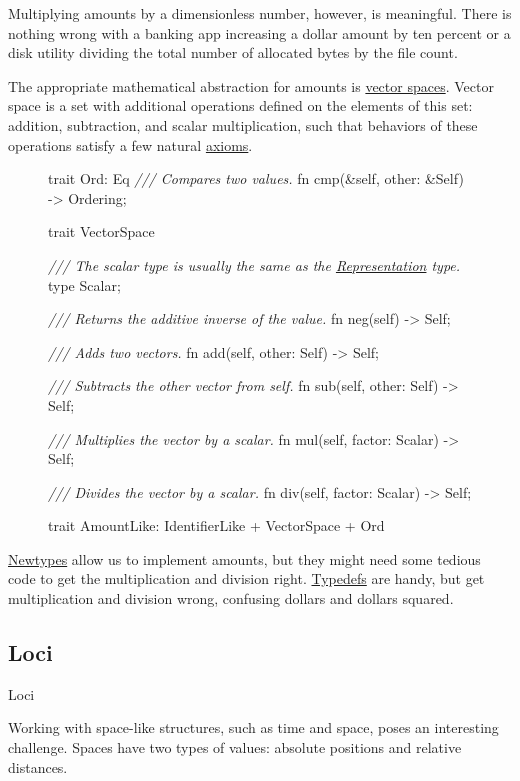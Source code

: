 \documentclass{article}
\begin{document}
Multiplying amounts by a dimensionless number, however, is meaningful.
There is nothing wrong with a banking app increasing a dollar amount by ten percent or a disk utility dividing the total number of allocated bytes by the file count.

The appropriate mathematical abstraction for amounts is \href{https://en.wikipedia.org/wiki/Vector_space}{vector spaces}.
Vector space is a set with additional operations defined on the elements of this set: addition, subtraction, and scalar multiplication, such that behaviors of these operations satisfy a few natural \href{https://en.wikipedia.org/wiki/Vector_space#Definition_and_basic_properties}{axioms}.

\begin{figure}
\begin{code}
trait Ord: Eq {
  \emph{/// Compares two values.}
  fn cmp(&self, other: &Self) -> Ordering;
}

trait VectorSpace {
  \emph{/// The scalar type is usually the same as the \href{#representation-type}{Representation} type.}
  type Scalar;

  \emph{/// Returns the additive inverse of the value.}
  fn neg(self) -> Self;

  \emph{/// Adds two vectors.}
  fn add(self, other: Self) -> Self;

  \emph{/// Subtracts the other vector from self.}
  fn sub(self, other: Self) -> Self;

  \emph{/// Multiplies the vector by a scalar.}
  fn mul(self, factor: Scalar) -> Self;

  \emph{/// Divides the vector by a scalar.}
  fn div(self, factor: Scalar) -> Self;
}

trait AmountLike: IdentifierLike + VectorSpace + Ord {}
\end{code}
\end{figure}

\href{#newtypes}{Newtypes} allow us to implement amounts, but they might need some tedious code to get the multiplication and division right.
\href{#typdefs}{Typedefs} are handy, but get multiplication and division wrong, confusing dollars and dollars squared.

\subsection{Loci}{Loci}

Working with space-like structures, such as time and space, poses an interesting challenge.
Spaces have two types of values: absolute positions and relative distances.
\end{document}
